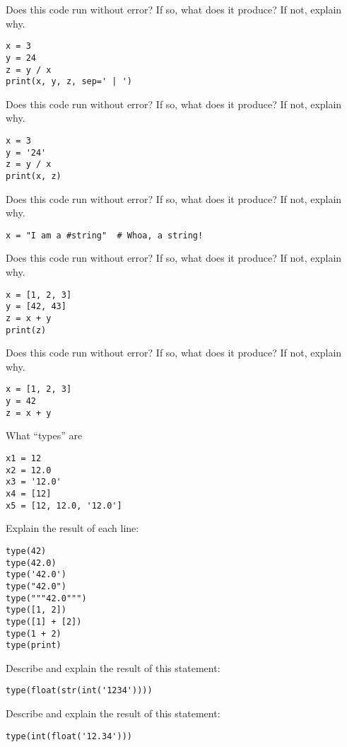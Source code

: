 \documentclass[11pt]{exam}
\begin{document}
\begin{questions}
\item Does this code run without error?  If so, what does it produce?  If not, explain why.
\begin{verbatim}
x = 3
y = 24
z = y / x
print(x, y, z, sep=' | ')
\end{verbatim}

\item Does this code run without error?  If so, what does it produce?  If not, explain why.
\begin{verbatim}
x = 3
y = '24'
z = y / x
print(x, z)
\end{verbatim}

\item Does this code run without error?  If so, what does it produce?  If not, explain why.
\begin{verbatim}
x = "I am a #string"  # Whoa, a string!
\end{verbatim}

\item Does this code run without error?  If so, what does it produce?  If not, explain why.
\begin{verbatim}
x = [1, 2, 3]
y = [42, 43]
z = x + y
print(z)
\end{verbatim}

\item Does this code run without error?  If so, what does it produce?  If not, explain why.
\begin{verbatim}
x = [1, 2, 3]
y = 42
z = x + y
\end{verbatim}

\item What ``types'' are
\begin{verbatim}
x1 = 12
x2 = 12.0
x3 = '12.0'
x4 = [12]
x5 = [12, 12.0, '12.0']
\end{verbatim}

\item Explain the result of each line:
\begin{verbatim}
type(42)
type(42.0)
type('42.0')
type("42.0")
type("""42.0""")
type([1, 2])
type([1] + [2])
type(1 + 2)
type(print)
\end{verbatim}

\item Describe and explain the result of this statement:
\begin{verbatim}
type(float(str(int('1234'))))
\end{verbatim}

\item Describe and explain the result of this statement:
\begin{verbatim}
type(int(float('12.34')))
\end{verbatim}


\end{questions}
\end{document}
